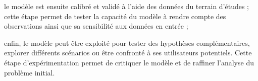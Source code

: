 \item le modèle est ensuite calibré et validé à l'aide des données
   du terrain d'études ; cette étape permet de tester la capacité
   du modèle à rendre compte des observations ainsi
   que sa sensibilité aux données en entrée ;

\item enfin, le modèle peut être exploité pour
   tester des hypothèses complémentaires, explorer
   différents scénarios ou être confronté à
   ses utilisateurs potentiels. Cette étape d'expérimentation
   permet de critiquer le modèle et de raffiner l'analyse du
   problème initial.

\stopitemize